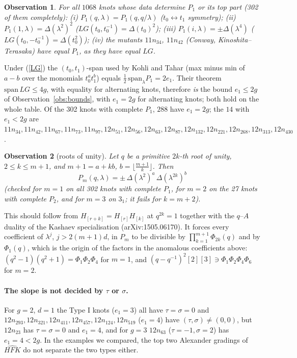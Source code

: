 \documentclass[11pt]{article}
\newtheorem{observation}{Observation}
\theoremstyle{definition}
\theoremstyle{remark}
\begin{document}
\begin{observation}\label{obs:lg}
For all $1068$ knots whose data determine $P_1$ or its top part (302 of them completely):
(i) $P_1(q,\lambda)=P_1(q,q/\lambda)$ ($t_0\leftrightarrow t_1$ symmetry);
(ii) $P_1(1,\lambda)=\Delta(\lambda^2)^2$ ($LG(t_0,t_0^{-1})=\Delta(t_0)^2$);
(iii) $P_1(i,\lambda)=\pm\Delta(\lambda^4)$ ($LG(t_0,-t_0^{-1})=\Delta(t_0^2)$);
(iv) the mutants $11n_{34}$, $11n_{42}$ (Conway, Kinoshita--Terasaka) have equal $P_1$, as they have equal $LG$.
\end{observation}
Under (\ref{LG}) the $(t_0,t_1)$-span used by Kohli and Tahar (max minus min of $a-b$ over the monomials
$t_0^at_1^b$) equals $\tfrac12\,\mathrm{span}_\lambda P_1=2e_1$.  Their theorem
$\mathrm{span}\,LG\le 4g$, with equality for alternating knots, therefore \emph{is} the bound $e_1\le 2g$ of
Observation~\ref{obs:bounds}, with $e_1=2g$ for alternating knots; both hold on the whole table.
Of the 302 knots with complete $P_1$, $288$ have $e_1=2g$; the $14$ with $e_1<2g$ are
$11n_{34},11n_{42},11n_{67},11n_{73},11n_{97},12n_{51},12n_{56},12n_{63},12n_{87},12n_{132},12n_{221},
12n_{268},12n_{313},12n_{430}$.

\begin{observation}[roots of unity]\label{obs:roots}
Let $q$ be a primitive $2k$-th root of unity, $2\le k\le m+1$, and $m+1=a+kb$, $b=\lfloor\frac{m+1}k\rfloor$.  Then
\[
  P_m(q,\lambda)=\pm\,\Delta(\lambda^2)^{a}\,\Delta(\lambda^{2k})^{b}
\]
(checked for $m=1$ on all 302 knots with complete $P_1$, for $m=2$ on the 27 knots with complete $P_2$, and for $m=3$ on $3_1$; it fails for $k=m+2$).
\end{observation}
This should follow from $H_{[r+k]}=H_{[r]}H_{[k]}$ at $q^{2k}=1$ together with the $q$--$A$ duality of the
Kashaev specialisation (arXiv:1505.06170).  It forces every coefficient of $\lambda^j$, $j>2(m+1)d$, in
$P_m$ to be divisible by $\prod_{k=1}^{m+1}\Phi_{2k}(q)$ and by $\Phi_1(q)$, which is the origin of the
factors in the anomalous coefficients above: $(q^2-1)(q^2+1)=\Phi_1\Phi_2\Phi_4$ for $m=1$, and
$(q-q^{-1})^2[2][3]\ni\Phi_1\Phi_2\Phi_4\Phi_6$ for $m=2$.

\paragraph{The slope is not decided by $\tau$ or $\sigma$.}  For $g=2$, $d=1$ the Type I knots
($e_1=3$) all have $\tau=\sigma=0$ and $12n_{293},12n_{321},12n_{411},12n_{457},12n_{124},12n_{519}$
($e_1=4$) have $(\tau,\sigma)\neq(0,0)$, but $12n_{23}$ has $\tau=\sigma=0$ and $e_1=4$, and for $g=3$
$12n_{63}$ ($\tau=-1,\sigma=2$) has $e_1=4<2g$.  In the examples we compared, the top two Alexander gradings of $\widehat{HFK}$ do not
separate the two types either.
\end{document}

